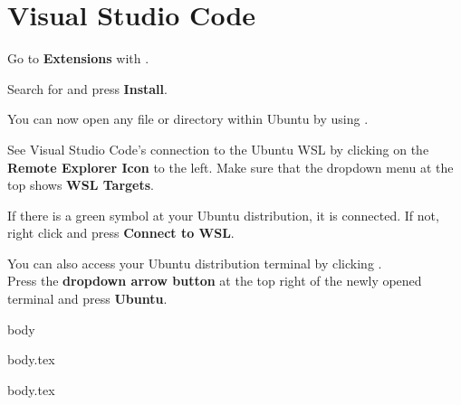 \section{Visual Studio Code}


Go to \textbf{Extensions} with .

Search for  and press \textbf{Install}.

You can now open any file or directory within Ubuntu by using .

See Visual Studio Code's connection to the Ubuntu WSL by clicking on the \textbf{Remote Explorer Icon} to the left. Make sure that the dropdown menu at the top shows \textbf{WSL Targets}.

If there is a green symbol at your Ubuntu distribution, it is connected. If not,\\right click and press \textbf{Connect to WSL}.

You can also access your Ubuntu distribution terminal by clicking .\\
Press the \textbf{dropdown arrow button} at the top right of the newly opened terminal and press \textbf{Ubuntu}.

\ifdefined\vscodeCProgramming
{body}
\fi

\ifdefined\vscodeLatex
{body.tex}
\fi

\ifdefined\vscodeExtras
{body.tex}
\fi